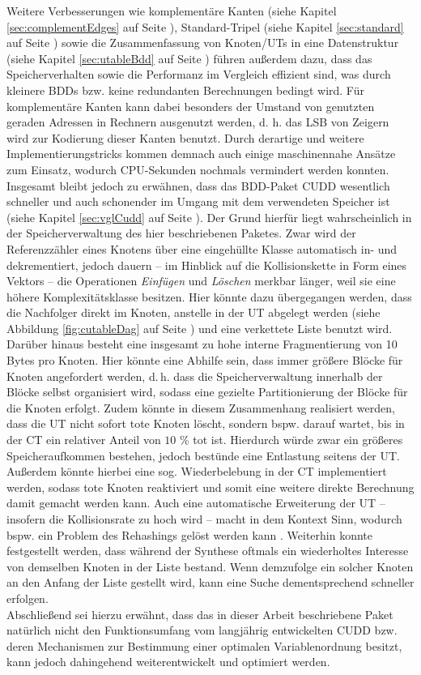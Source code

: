 Weitere Verbesserungen wie komplementäre Kanten (siehe Kapitel \ref{sec:complementEdges} auf Seite \pageref{sec:complementEdges}), Standard-Tripel (siehe Kapitel \ref{sec:standard} auf Seite \pageref{sec:standard}) sowie die Zusammenfassung von Knoten/UTs in eine Datenstruktur (siehe Kapitel \ref{sec:utableBdd} auf Seite \pageref{sec:utableBdd}) führen außerdem dazu, dass das Speicherverhalten sowie die Performanz im Vergleich effizient sind, was durch kleinere BDDs bzw. keine redundanten Berechnungen bedingt wird. Für komplementäre Kanten kann dabei besonders der Umstand von genutzten geraden Adressen in Rechnern ausgenutzt werden, d. h. das LSB von Zeigern wird zur Kodierung dieser Kanten benutzt. Durch derartige und weitere Implementierungstricks kommen demnach auch einige maschinennahe Ansätze zum Einsatz, wodurch CPU-Sekunden nochmals vermindert werden konnten.\\
Insgesamt bleibt jedoch zu erwähnen, dass das BDD-Paket CUDD wesentlich schneller und auch schonender im Umgang mit dem verwendeten Speicher ist (siehe Kapitel \ref{sec:vglCudd} auf Seite \pageref{sec:vglCudd}). Der Grund hierfür liegt wahrscheinlich in der Speicherverwaltung des hier beschriebenen Paketes. Zwar wird der Referenzzähler eines Knotens über eine eingehüllte Klasse automatisch in- und dekrementiert, jedoch dauern -- im Hinblick auf die Kollisionskette in Form eines Vektors -- die Operationen \emph{Einfügen} und \emph{Löschen} merkbar länger, weil sie eine höhere Komplexitätsklasse besitzen. Hier könnte dazu übergegangen werden, dass die Nachfolger direkt im Knoten, anstelle in der UT abgelegt werden (siehe Abbildung \ref{fig:cutableDag} auf Seite \pageref{fig:cutableDag}) und eine verkettete Liste benutzt wird. Darüber hinaus besteht eine insgesamt zu hohe interne Fragmentierung von 10 Bytes pro Knoten. Hier könnte eine Abhilfe sein, dass immer größere Blöcke für Knoten angefordert werden, d.\,h. dass die Speicherverwaltung innerhalb der Blöcke selbst organisiert wird, sodass eine gezielte Partitionierung der Blöcke für die Knoten erfolgt. Zudem könnte in diesem Zusammenhang realisiert werden, dass die UT nicht sofort tote Knoten löscht, sondern bspw. darauf wartet, bis in der CT ein relativer Anteil von $10$ \% tot ist. Hierdurch würde zwar ein größeres Speicheraufkommen bestehen, jedoch bestünde eine Entlastung seitens der UT. Außerdem könnte hierbei eine sog. Wiederbelebung in der CT implementiert werden, sodass tote Knoten reaktiviert und somit eine weitere direkte Berechnung damit gemacht werden kann. Auch eine automatische Erweiterung der UT -- insofern die Kollisionsrate zu hoch wird -- macht in dem Kontext Sinn, wodurch bspw. ein Problem des Rehashings gelöst werden kann \cite[S.78-80]{h2002}. Weiterhin konnte festgestellt werden, dass während der Synthese oftmals ein wiederholtes Interesse von demselben Knoten in der Liste bestand. Wenn demzufolge ein solcher Knoten an den Anfang der Liste gestellt wird, kann eine Suche dementsprechend schneller erfolgen.\\
Abschließend sei hierzu erwähnt, dass das in dieser Arbeit beschriebene Paket natürlich nicht den Funktionsumfang vom langjährig entwickelten CUDD bzw. deren Mechanismen zur Bestimmung einer optimalen Variablenordnung besitzt, kann jedoch dahingehend weiterentwickelt und optimiert werden.
